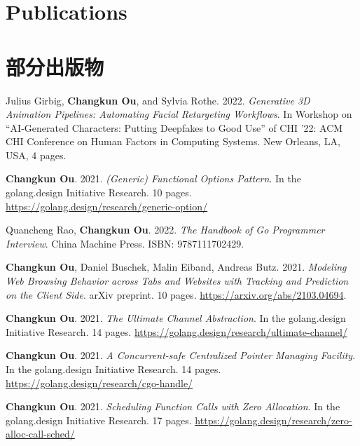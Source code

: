  {
    \section{\textbf{Publications}}
}{
    \section{\textbf{部分出版物}}
}
\resumeSubHeadingListStart
\small
    \item{
        Julius Girbig, \textbf{Changkun Ou}, and Sylvia Rothe. 2022.
        \emph{Generative 3D Animation Pipelines: Automating Facial Retargeting Workflows}.
        In Workshop on ``AI-Generated Characters: Putting Deepfakes to Good Use'' of CHI '22: ACM CHI Conference on Human Factors in Computing Systems. New Orleans, LA, USA, 4 pages.
    }
    \item{
        \textbf{Changkun Ou}. 2021.
        \emph{(Generic) Functional Options Pattern}.
        In the golang.design Initiative Research. 10 pages.
        \url{https://golang.design/research/generic-option/}
    }
    \item{
        Quancheng Rao, \textbf{Changkun Ou}. 2022.
        \emph{The Handbook of Go Programmer Interview}.
        China Machine Press. ISBN: 9787111702429.
    }
    \item{
        \textbf{Changkun Ou}, Daniel Buschek, Malin Eiband, Andreas Butz. 2021.
        \emph{Modeling Web Browsing Behavior across Tabs and Websites with Tracking and Prediction on the Client Side}.
        arXiv preprint. 10 pages.
        \url{https://arxiv.org/abs/2103.04694}.
    }
    \item{
        \textbf{Changkun Ou}. 2021.
        \emph{The Ultimate Channel Abstraction}.
        In the golang.design Initiative Research. 14 pages.
        \url{https://golang.design/research/ultimate-channel/}
    }
    \item{
        \textbf{Changkun Ou}. 2021.
        \emph{A Concurrent-safe Centralized Pointer Managing Facility}.
        In the golang.design Initiative Research. 14 pages.
        \url{https://golang.design/research/cgo-handle/}
    }
    \item{
        \textbf{Changkun Ou}. 2021.
        \emph{Scheduling Function Calls with Zero Allocation}.
        In the golang.design Initiative Research. 17 pages.
        \url{https://golang.design/research/zero-alloc-call-sched/}
    }

